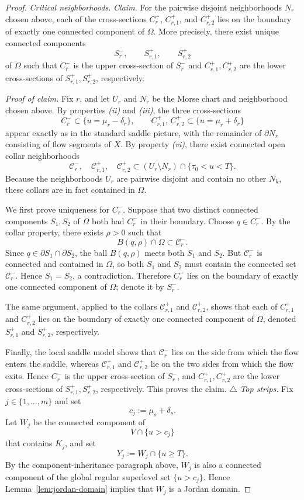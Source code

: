 \documentclass[12pt]{amsart}
\theoremstyle{definition}
\theoremstyle{remark}
\begin{document}
\begin{proof}
\smallskip
\noindent\emph{Critical neighborhoods.}
\medskip
\noindent\emph{Claim.}
For the pairwise disjoint neighborhoods $N_r$ chosen above, each of the cross-sections
$C_r^{-}$, $C_{r,1}^{+}$, and $C_{r,2}^{+}$ lies on the boundary of exactly one connected component of
$\Omega$. More precisely, there exist unique connected components
\[
S_r^{-},\qquad S_{r,1}^{+},\qquad S_{r,2}^{+}
\]
of $\Omega$ such that $C_r^{-}$ is the upper cross-section of $S_r^{-}$ and
$C_{r,1}^{+}, C_{r,2}^{+}$ are the lower cross-sections of $S_{r,1}^{+}, S_{r,2}^{+}$, respectively.

\smallskip
\noindent\emph{Proof of claim.}
Fix $r$, and let $U_r$ and $N_r$ be the Morse chart and neighborhood chosen above. By properties \emph{(ii)} and \emph{(iii)}, the three cross-sections
\[
C_r^- \subset \{u=\mu_r-\delta_r\},
\qquad
C_{r,1}^+,\, C_{r,2}^+ \subset \{u=\mu_r+\delta_r\}
\]
appear exactly as in the standard saddle picture, with the remainder of $\partial N_r$
consisting of flow segments of $X$. By property \emph{(vi)}, there exist connected
open collar neighborhoods
\[
\mathcal C_r^-,
\quad
\mathcal C_{r,1}^+,
\quad
\mathcal C_{r,2}^+
\subset (U_r \setminus N_r)\cap \{\tau_0<u<T\}.
\]
Because the neighborhoods $U_r$ are pairwise disjoint and contain no other $N_k$, these collars are in fact contained in $\Omega$.

We first prove uniqueness for $C_r^-$. Suppose that two distinct connected components
$S_1,S_2$ of $\Omega$ both had $C_r^-$ in their boundary. Choose $q\in C_r^-$. By the
collar property, there exists $\rho>0$ such that
\[
B(q,\rho)\cap\Omega \subset \mathcal C_r^-.
\]
Since $q\in \partial S_1 \cap \partial S_2$, the ball $B(q,\rho)$ meets both $S_1$ and
$S_2$. But $\mathcal C_r^-$ is connected and contained in $\Omega$, so both $S_1$ and
$S_2$ must contain the connected set $\mathcal C_r^-$. Hence $S_1=S_2$, a contradiction.
Therefore $C_r^-$ lies on the boundary of exactly one connected component of $\Omega$;
denote it by $S_r^-$.

The same argument, applied to the collars $\mathcal C_{r,1}^+$ and $\mathcal C_{r,2}^+$,
shows that each of $C_{r,1}^+$ and $C_{r,2}^+$ lies on the boundary of exactly one
connected component of $\Omega$, denoted $S_{r,1}^+$ and $S_{r,2}^+$, respectively.

Finally, the local saddle model shows that $\mathcal C_r^-$ lies on the side from which
the flow enters the saddle, whereas $\mathcal C_{r,1}^+$ and $\mathcal C_{r,2}^+$ lie on
the two sides from which the flow exits. Hence $C_r^-$ is the upper cross-section of
$S_r^-$, and $C_{r,1}^+, C_{r,2}^+$ are the lower cross-sections of $S_{r,1}^+, S_{r,2}^+$,
respectively. This proves the claim.
\hfill$\triangle$
\smallskip
\noindent\emph{Top strips.}
Fix $j\in\{1,\dots,m\}$ and set
\[
c_j:=\mu_s+\delta_s.
\]
Let $W_j$ be the connected component of
\[
V\cap\{u>c_j\}
\]
that contains $K_j$, and set
\[
Y_j:=W_j\cap\{u\ge T\}.
\]
By the component-inheritance paragraph above, $W_j$ is also a connected component of the global regular superlevel set $\{u>c_j\}$. Hence Lemma~\ref{lem:jordan-domain} implies that $W_j$ is a Jordan domain.


\end{proof}
\end{document}
